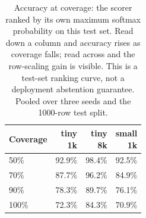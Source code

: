 \begin{table}[htbp]
\centering
\caption{Accuracy at coverage: the scorer ranked by its own maximum softmax
probability on this test set. Read down a column and accuracy rises as coverage
falls; read across and the row-scaling gain is visible. This is a test-set
ranking curve, not a deployment abstention guarantee. Pooled over three seeds
and the 1000-row test split.}
\label{tab:risk-coverage}
\setlength{\tabcolsep}{4pt}
\begin{tabular}{lrrr}
\toprule
Coverage & \shortstack{tiny\\1k} & \shortstack{tiny\\8k} & \shortstack{small\\1k} \\
\midrule
50\% & 92.9\% & 98.4\% & 92.5\% \\
70\% & 87.7\% & 96.2\% & 84.9\% \\
90\% & 78.3\% & 89.7\% & 76.1\% \\
100\% & 72.3\% & 84.3\% & 70.9\% \\
\bottomrule
\end{tabular}
\end{table}
